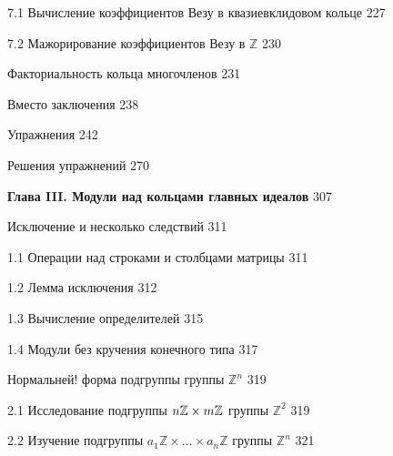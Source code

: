 \documentclass{mai_book}
\begin{document}
{    7.1 Вычисление коэффициентов Везу в квазиевклидовом кольце \dotfill \hspace{0.5cm} 227 
    
    7.2 Мажорирование коэффициентов Везу в $\mathbb{Z}$ \dotfill \hspace{0.5cm} 230
    
 \hspace{0.05cm} Факториальность кольца многочленов \dotfill \hspace{0.5cm} 231
    
 \hspace{0.05cm} Вместо заключения \dotfill \hspace{0.5cm} 238
    
\noindent Упражнения \dotfill \hspace{0.5cm} 242
    
\noindent Решения упражнений \dotfill \hspace{0.5cm} 270

\newpage

\noindent \textbf{Глава III. Модули над кольцами главных идеалов} \dotfill \hspace{0.5cm} 307 
    
 \hspace{0.05cm} Исключение и несколько следствий \dotfill \hspace{0.5cm} 311 

    1.1 Операции над строками и столбцами матрицы \dotfill \hspace{0.5cm} 311 

    1.2 Лемма исключения \dotfill \hspace{0.5cm} 312
    
1.3 Вычисление определителей \dotfill \hspace{0.5cm} 315

1.4 Модули без кручения конечного типа \dotfill \hspace{0.5cm} 317

 \hspace{0.05cm} Нормальней! форма подгруппы группы $\mathbb{Z}^{n}$ \dotfill \hspace{0.5cm} 319

 2.1 Исследование подгруппы $\small{n}\mathbb{Z} \times \small{m}\mathbb{Z}$ группы $\mathbb{Z}^{2}$ \dotfill \hspace{0.5cm} 319
 
 2.2 Изучение подгруппы $a_{1}\mathbb{Z} \times . . . \times a_{n}\mathbb{Z}$ группы $\mathbb{Z}^{n}$  \dotfill \hspace{0.5cm} 321
 
}
\end{document}
